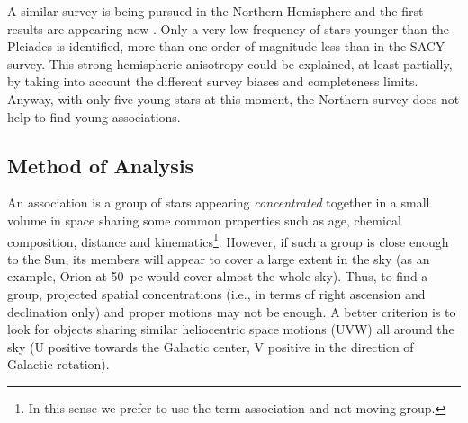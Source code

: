 \documentclass[11pt,twoside]{book}
\begin{document}
A similar survey is being pursued in the Northern Hemisphere and the
first results are appearing now \citep{guillout08}.
Only a very low frequency of
stars younger than the Pleiades is identified, more than one order of magnitude less than in the SACY survey.
This strong hemispheric anisotropy could be explained, at least partially, by
taking into account the different survey biases and completeness limits.
Anyway, with only five young stars at this moment, the Northern survey does not help to find young associations.


\subsection{Method of Analysis}

An association is a group of stars appearing {\it concentrated}
together in a small volume in space sharing some common properties
such as age, chemical composition, distance and kinematics\footnote{
In this sense we prefer to use the term association and not moving
group.}.  However, if such a group is close enough to the Sun, its
members will appear to cover a large extent in the sky (as an example,
Orion at 50~pc would cover almost the whole sky).  Thus, to find a
group, projected spatial concentrations (i.e., in terms of right
ascension and declination only) and proper motions may not be enough.
A better criterion is to look for objects sharing similar heliocentric
space motions (UVW) all around the sky (U positive towards the
Galactic center, V positive in the direction of Galactic rotation).
\end{document}
